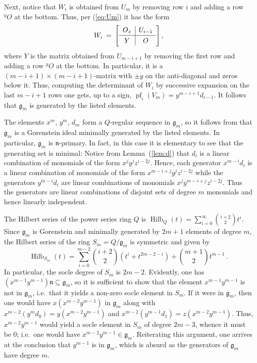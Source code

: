 \documentclass{amsart}
\theoremstyle{bfupright head,upright body}
\theoremstyle{fixed bf head,slanted body}
\theoremstyle{fixed bf head,upright body}
\theoremstyle{numbered paragraph}
\newenvironment{prf*}[1][Proof]{%
  \begin{proof}[\bf #1]
    \setcounter{equation}{0}
    \renewcommand{\theequation}{\arabic{equation}}}
  {\end{proof}
}
\renewcommand{\eqref}[1]{\pgref{eq:#1}}
\newcommand{\pgref}[1]{(\ref{#1})}
\newcommand{\lemref}[2][Lemma~]{#1\pgref{lem:#2}}
\newcommand{\thmcite}[2][?]{\cite[thm.~#1]{#2}}
\newcommand{\deq}{\:=\:}
\newcommand{\n}{\mathfrak{n}}
\newcommand{\Hilb}[1]{\operatorname{Hilb}_{#1}(t)}
\newcommand{\pf}[2]{\operatorname{pf}_{#1}(#2)}
\newcommand{\Ox}{O_x}
\newcommand{\Oy}{{}^yO}
\newcommand{\fg}{\mathfrak{g}}
\numberwithin{equation}{res}
\begin{document}
\begin{prf*}
  Next, notice that $W_i$ is obtained from $U_m$ by removing row $i$
  and adding a row $\Oy$ at the bottom. Thus, per \eqref{Um} it has
  the form
  \begin{equation*}
    W_i \deq \left[
      \begin{array}[c]{c|c}
        \Ox & U_{i-1}\\[1pt]
        \hline
        \phantom{\raisebox{3pt}{$|$}}Y\phantom{\raisebox{3pt}{$|$}} & O
      \end{array}
    \right],
  \end{equation*}
  where $Y$ is the matrix obtained from $U_{m-i+1}$ by removing the
  first row and adding a row $\Oy$ at the bottom. In particular, it is
  a $(m-i+1)\times (m-i+1)$-matrix with $\pm y$ on the anti-diagonal
  and zeros below it.  Thus, computing the determinant of $W_i$ by
  successive expansion on the last $m-i+1$ rows one gets, up to a
  sign, $\pf{i}{V_m} = y^{m-i+1}d_{i-1}$. It follows that $\fg_m$ is
  generated by the listed elements.

  The elements $x^m$, $y^m$, $d_m$ form a $Q$-regular sequence in
  $\fg_m$, so it follows from \thmcite[2.1]{DABDEs77} that $\fg_m$ is
  a Gorenstein ideal minimally generated by the listed elements. In
  particular, $\fg_m$ is $\n$-primary. In fact, in this case it is
  elementary to see that the generating set is minimal: Notice from
  \lemref{d} that $d_i$ is a linear combination of monomials of the
  form $x^jy^jz^{i-2j}$. Hence, each generator $x^{m-i}d_i$ is a
  linear combination of monomials of the form $x^{m-i+j}y^jz^{i-2j}$
  while the generators $y^{m-i}d_i$ are linear combinations of
  monomials $x^jy^{m-i+j}z^{i-2j}$. Thus the generators are linear
  combinations of disjoint sets of degree $m$ monomials and hence
  linearly independent.

  The Hilbert series of the power series ring $Q$ is
  $\Hilb{Q}=\sum_{i=0}^{\infty}\binom{i+2}{2}t^i$.  Since $\fg_m$ is
  Gorenstein and minimally generated by $2m+1$ elements of degree $m$,
  the Hilbert series of the ring $S_m=Q/\fg_m$ is symmetric and given
  by
  \begin{equation*}
    \Hilb{S_m} = \sum_{i=0}^{m-2} \binom{i+2}{2}\left (t^i+t^{2m-2-i}\right) 
    + \binom {m+1}{2}t^{m-1}\:.
  \end{equation*}
  In particular, the socle degree of $S_m$ is $2m-2$. Evidently, one
  has $(x^{m-1}y^{m-1})\mathfrak{n} \subseteq \fg_m$, so it is
  sufficient to show that the element $x^{m-1}y^{m-1}$ is not in
  $\fg_m$, i.e.\ that it yields a non-zero socle element in $S_m$. If
  it were in $\fg_m$, then one would have $x(x^{m-2}y^{m-1})$ in
  $\fg_m$ along with $x^{m-2}(y^md_0) = y(x^{m-2}y^{m-1})$ and
  $x^{m-2}(y^{m-1}d_1) = z(x^{m-2}y^{m-1})$. Thus, $x^{m-2}y^{m-1}$
  would yield a socle element in $S_m$ of degree $2m-3$, whence it
  must be $0$; i.e.\ one would have $x^{m-2}y^{m-1} \in
  \fg_m$. Reiterating this argument, one arrives at the conclusion
  that $y^{m-1}$ is in $\fg_m$, which is absurd as the generators of
  $\fg_m$ have degree $m$.
\end{prf*}
\end{document}
